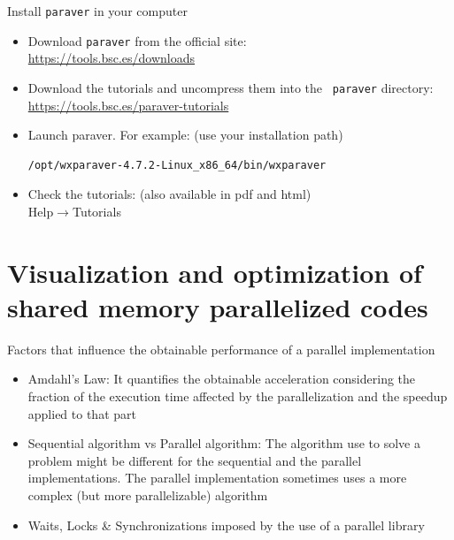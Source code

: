 \documentclass[10pt,xcolor=table]{beamer}
\begin{document}
\begin{frame}[fragile]{Install {\tt paraver} in your computer}
  \begin{itemize}
  \item Download {\tt paraver} from the official site:\\
    \hfil \url{https://tools.bsc.es/downloads}
  \item Download the tutorials and uncompress them into the {\tt
      paraver} directory:\\
    \hfil \url{https://tools.bsc.es/paraver-tutorials}
  \item Launch paraver. For example: (use your installation path)
    \begin{lstlisting}[style=shell,gobble=3]
      /opt/wxparaver-4.7.2-Linux_x86_64/bin/wxparaver
    \end{lstlisting}
  \item Check the tutorials: {\small (also available in pdf and html)}\\
    \hfil Help$\rightarrow$Tutorials
  \end{itemize}
\end{frame}




\section{Visualization and optimization of shared memory parallelized codes}


\begin{frame}{Factors that influence the obtainable performance of a parallel implementation}
\begin{itemize}
    \item Amdahl's Law: It quantifies the obtainable acceleration considering the fraction of the execution time affected by the parallelization and the speedup applied to that part
    \item Sequential algorithm vs Parallel algorithm: The algorithm use to solve a problem might be different for the sequential and the parallel implementations. The parallel implementation sometimes uses a more complex (but more parallelizable) algorithm
    \item Waits, Locks \& Synchronizations imposed by the use of a parallel library
\end{itemize}    
\end{frame}
\end{document}
